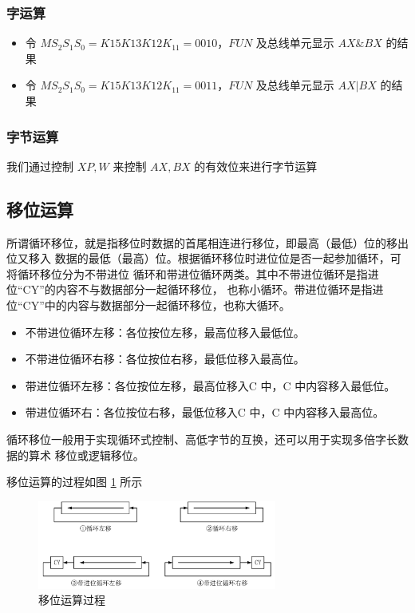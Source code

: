 \documentclass[a4paper,10pt,UTF8]{paper}
\numberwithin{equation}{section}
\numberwithin{figure}{section}
\begin{document}
\subsubsection{字运算}

\begin{itemize}
  \item 令 $MS_2S_1S_0=K{15}K{13}K{12}K_{11}=0010$，$FUN$ 及总线单元显示 $AX \& BX$ 的结果
  \item 令 $MS_2S_1S_0=K{15}K{13}K{12}K_{11}=0011$，$FUN$ 及总线单元显示 $AX | BX$ 的结果
\end{itemize}

\subsubsection{字节运算}

我们通过控制 $XP,W$ 来控制 $AX, BX$ 的有效位来进行字节运算

\subsection{移位运算}

所谓循环移位，就是指移位时数据的首尾相连进行移位，即最高（最低）位的移出位又移入
数据的最低（最高）位。根据循环移位时进位位是否一起参加循环，可将循环移位分为不带进位
循环和带进位循环两类。其中不带进位循环是指进位“CY”的内容不与数据部分一起循环移位，
也称小循环。带进位循环是指进位“CY”中的内容与数据部分一起循环移位，也称大循环。

\begin{itemize}
  \item 不带进位循环左移：各位按位左移，最高位移入最低位。
  \item 不带进位循环右移：各位按位右移，最低位移入最高位。
  \item 带进位循环左移：各位按位左移，最高位移入C 中，C 中内容移入最低位。
  \item 带进位循环右：各位按位右移，最低位移入C 中，C 中内容移入最高位。
\end{itemize}

循环移位一般用于实现循环式控制、高低字节的互换，还可以用于实现多倍字长数据的算术
移位或逻辑移位。

移位运算的过程如图 \ref{fig:shift} 所示

\begin{figure}[h]
  \centering
  \includegraphics[width=0.7\textwidth]{4.jpg}
  \caption{移位运算过程}
  \label{fig:shift}
\end{figure}
\end{document}
